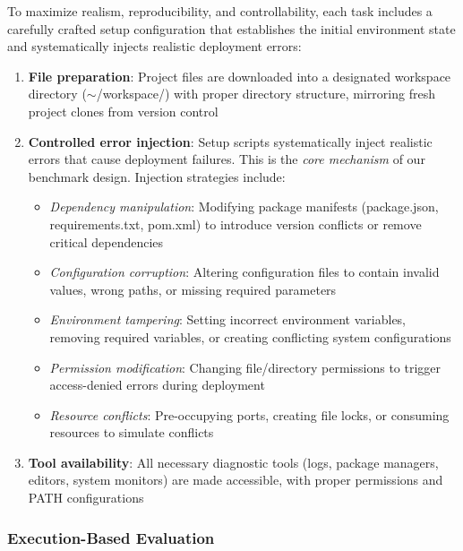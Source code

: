 To maximize realism, reproducibility, and controllability, each task includes a carefully crafted setup configuration that establishes the initial environment state and systematically injects realistic deployment errors:

\begin{enumerate}
\item \textbf{File preparation}: Project files are downloaded into a designated workspace directory ($\sim$/workspace/) with proper directory structure, mirroring fresh project clones from version control

\item \textbf{Controlled error injection}: Setup scripts systematically inject realistic errors that cause deployment failures. This is the \textit{core mechanism} of our benchmark design. Injection strategies include:
\begin{itemize}
    \item \textit{Dependency manipulation}: Modifying package manifests (package.json, requirements.txt, pom.xml) to introduce version conflicts or remove critical dependencies
    \item \textit{Configuration corruption}: Altering configuration files to contain invalid values, wrong paths, or missing required parameters
    \item \textit{Environment tampering}: Setting incorrect environment variables, removing required variables, or creating conflicting system configurations
    \item \textit{Permission modification}: Changing file/directory permissions to trigger access-denied errors during deployment
    \item \textit{Resource conflicts}: Pre-occupying ports, creating file locks, or consuming resources to simulate conflicts
\end{itemize}



\item \textbf{Tool availability}: All necessary diagnostic tools (logs, package managers, editors, system monitors) are made accessible, with proper permissions and PATH configurations
\end{enumerate}




\subsubsection{Execution-Based Evaluation}

